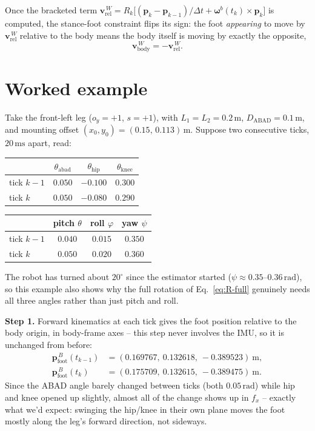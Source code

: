 \documentclass[11pt]{article}
\begin{document}
Once the bracketed term $\mathbf{v}_{\text{rel}}^{\,W} = R_k\big[(\mathbf{p}_k - \mathbf{p}_{k-1})/\Delta t + \boldsymbol\omega^b(t_k)\times\mathbf{p}_k\big]$ is
computed, the stance-foot constraint flips its sign: the foot
\emph{appearing} to move by $\mathbf{v}_{\text{rel}}^{\,W}$ relative to the body
means the body itself is moving by exactly the opposite,
\begin{equation}
\mathbf{v}_{\text{body}}^{\,W} = -\mathbf{v}_{\text{rel}}^{\,W}.
\end{equation}

\section{Worked example}
\label{sec:worked-example}

Take the front-left leg ($o_y = +1$, $s = +1$), with
$L_1 = L_2 = 0.2\,\text{m}$, $D_{\text{ABAD}} = 0.1\,\text{m}$, and mounting
offset $(x_0, y_0) = (0.15,\, 0.113)\,\text{m}$. Suppose two consecutive
ticks, $20\,\text{ms}$ apart, read:

\begin{center}
\begin{tabular}{@{}lccc@{}}
\toprule
 & $\theta_{\text{abad}}$ & $\theta_{\text{hip}}$ & $\theta_{\text{knee}}$ \\
\midrule
tick $k-1$ & $0.050$ & $-0.100$ & $0.300$ \\
tick $k$   & $0.050$ & $-0.080$ & $0.290$ \\
\bottomrule
\end{tabular}
\qquad
\begin{tabular}{@{}lccc@{}}
\toprule
 & pitch $\theta$ & roll $\varphi$ & yaw $\psi$ \\
\midrule
tick $k-1$ & $0.040$ & $0.015$ & $0.350$ \\
tick $k$   & $0.050$ & $0.020$ & $0.360$ \\
\bottomrule
\end{tabular}
\end{center}
The robot has turned about $20^\circ$ since the estimator started ($\psi
\approx 0.35$--$0.36\,\text{rad}$), so this example also shows why the full
rotation of Eq.~\eqref{eq:R-full} genuinely needs all three angles rather
than just pitch and roll.

\noindent \textbf{Step 1.} Forward kinematics at each tick gives the
foot position relative to the body origin, in body-frame axes -- this step
never involves the IMU, so it is unchanged from before:
\begin{align}
\mathbf{p}_{\text{foot}}^{\,B}(t_{k-1}) &= (0.169767,\ 0.132618,\ -0.389523)\ \text{m}, \\
\mathbf{p}_{\text{foot}}^{\,B}(t_{k})   &= (0.175709,\ 0.132615,\ -0.389475)\ \text{m}.
\end{align}
Since the ABAD angle barely changed between ticks (both $0.05\,\text{rad}$)
while hip and knee opened up slightly, almost all of the change shows up in
$f_x$ -- exactly what we'd expect: swinging the hip/knee in their own plane
moves the foot mostly along the leg's forward direction, not sideways.
\end{document}

